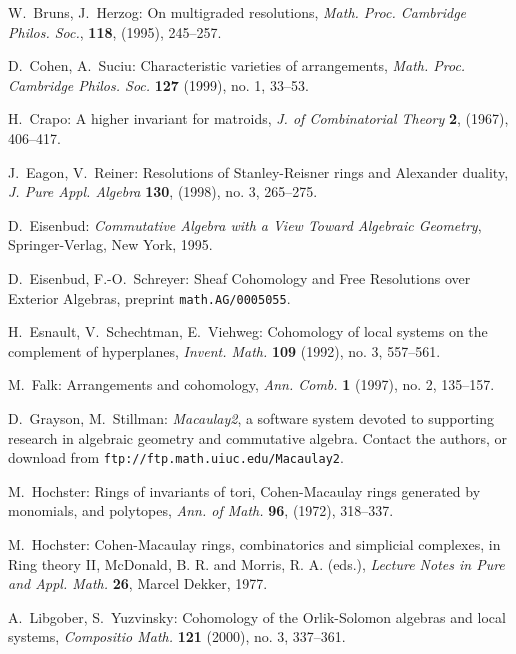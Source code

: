 \documentclass{tran-l}
\theoremstyle{definition}
\theoremstyle{remark}
\begin{document}
\begin{thebibliography}{Bjo2}
 W.~Bruns, J.~Herzog: On multigraded resolutions, 
{\sl Math. Proc. Cambridge Philos. Soc.}, \textbf{118}, (1995), 245--257.  


 D.~Cohen, A.~Suciu: Characteristic varieties of arrangements,
{\sl Math. Proc. Cambridge Philos. Soc.} \textbf{127} (1999), no. 1, 33--53.


 H.~Crapo: A higher invariant for matroids, {\sl J. of
Combinatorial Theory} \textbf{2}, (1967), 406--417.  

 J.~Eagon, V.~Reiner: Resolutions of Stanley-Reisner rings and 
Alexander duality, {\sl J. Pure Appl. Algebra} \textbf{130}, (1998), no.
3, 265--275. 

 D.~Eisenbud:
{\sl Commutative Algebra with a View Toward Algebraic Geometry},
Springer-Verlag, New York, 1995.

  D.~Eisenbud, F.-O.~Schreyer: 
Sheaf Cohomology and Free Resolutions over Exterior Algebras, 
preprint {\tt math.AG/0005055}.


 H.~Esnault, V.~Schechtman, E.~Viehweg:
Cohomology of local systems on the complement of hyperplanes, 
{\sl Invent. Math.} \textbf{109} (1992), no. 3, 557--561.


 M.~Falk: Arrangements and cohomology, 
{\sl Ann. Comb.} \textbf{1} (1997), no. 2, 135--157. 

 D.~Grayson, M.~Stillman: {\it Macaulay2}, a
software system devoted to supporting research in algebraic geometry
and commutative algebra.  Contact the authors, or download from
{\tt ftp://ftp.math.uiuc.edu/Macaulay2}.


  M.~Hochster: Rings of invariants of tori, Cohen-Macaulay
rings generated by monomials, and polytopes, {\sl Ann. of Math.} \textbf{96},
(1972), 318--337. 

 M.~Hochster: Cohen-Macaulay rings, combinatorics and
simplicial complexes, in Ring theory II,  McDonald, B. R. and Morris, R. A. (eds.),
{\it Lecture Notes in Pure and Appl. Math.} \textbf{26}, Marcel Dekker, 1977.


  A.~Libgober, S.~Yuzvinsky: Cohomology of the Orlik-Solomon
algebras  and local systems, {\it Compositio Math.} \textbf{121} (2000), no. 3,
337--361. 


\end{thebibliography}
\end{document}

